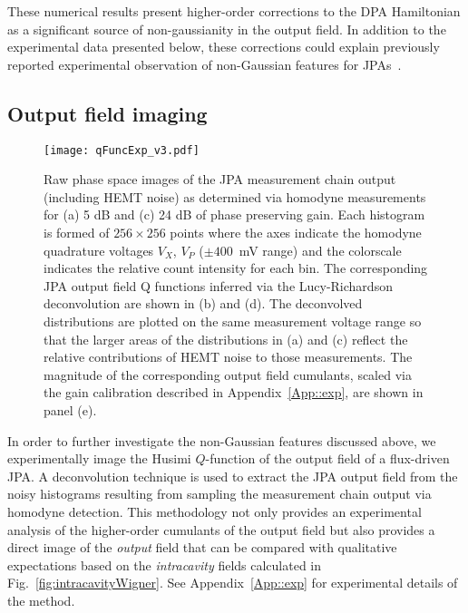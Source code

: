 \documentclass[pra,twocolumn,superscriptaddress]{revtex4-1}
\begin{document}
These numerical results present higher-order corrections to the DPA Hamiltonian as a significant source of non-gaussianity in the output field. 
In addition to the experimental data presented below, these corrections could explain previously reported experimental observation of non-Gaussian features for JPAs~\cite{Mallet:2011fk,Zhong:2013vn}.


\subsection{Output field imaging}\label{sec::imaging}
\begin{figure}[tb]
	\texttt{[image: qFuncExp\_v3.pdf]}
	\caption{
	Raw phase space images of the JPA measurement chain output (including HEMT noise) as determined via homodyne measurements for (a) 5 dB and (c) 24 dB of phase preserving gain. 
	Each histogram is formed of $256 \times 256$ points where the axes indicate the homodyne quadrature voltages $V_X$, $V_P$ ($\pm 400$~mV range) and the colorscale indicates the relative count intensity for each bin.
	The corresponding JPA output field Q functions inferred via the Lucy-Richardson deconvolution are shown in (b) and (d).
	The deconvolved distributions are plotted on the same measurement voltage range so that the larger areas of the distributions in (a) and (c) reflect the relative contributions of HEMT noise to those measurements. The magnitude of the corresponding output field cumulants, scaled via the gain calibration described in Appendix~\ref{App::exp}, are shown in panel (e).
	\label{fig:qFuncExp}
	}
\end{figure}

In order to further investigate the non-Gaussian features discussed above, we experimentally image the Husimi $Q$-function of the output field of a flux-driven JPA. A deconvolution technique is used to extract the JPA output field from the noisy histograms resulting from sampling the measurement chain output via homodyne detection. This methodology not only provides an experimental analysis of the higher-order cumulants of the output field but also provides a direct image of the \emph{output} field that can be compared with qualitative expectations based on the \emph{intracavity} fields calculated in Fig.~\ref{fig:intracavityWigner}. See Appendix~\ref{App::exp} for experimental details of the method.
\end{document}
